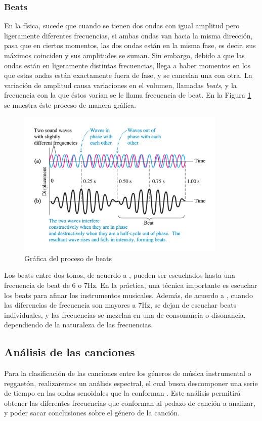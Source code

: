 \documentclass[12pt, letterpaper]{article}
\begin{document}
\subsubsection{Beats}
En la física, sucede que cuando se tienen dos ondas con igual amplitud pero ligeramente diferentes frecuencias, si ambas ondas van hacia la 
misma dirección, pasa que en ciertos momentos, las dos ondas están en la misma fase, es decir, sus máximos coinciden y sus amplitudes se suman. Sin embargo, 
debido a que las ondas están en ligeramente distintas frecuencias, llega a haber momentos en los que estas ondas están 
exactamente fuera de fase, y se cancelan una con otra. La variación de amplitud causa variaciones en el volumen, llamadas \textit{beats}, y la frecuencia 
con la que éstos varían se le llama frecuencia de beat. En la Figura \ref{beats-grafica} se muestra éste proceso de manera gráfica.
\begin{figure}[H]
  \centering
  \includegraphics[height = 7cm]{imgs/investigacion/beats-grafica.png}
  \caption{Gráfica del proceso de beats}
  \label{beats-grafica}
\end{figure}Los beats entre dos tonos, de acuerdo a \cite{university-physics}, pueden ser escuchados hasta una frecuencia de beat de 6 o 7Hz. En la práctica, 
una técnica importante es escuchar los beats para afinar los instrumentos musicales. Además, de acuerdo a \cite{university-physics}, cuando las diferencias de 
frecuencia son mayores a 7Hz, se dejan de escuchar beats individuales, y las frecuencias se mezclan en una de consonancia o disonancia, dependiendo de la 
naturaleza de las frecuencias. 
\subsection{Análisis de las canciones}

Para la clasificación de las canciones entre los géneros de música instrumental o reggaetón,
realizaremos un análisis espectral, el cual busca descomponer una serie de tiempo en las
ondas senoidales que la conforman \cite{Montenegro-2009}. Este análisis permitirá obtener las
diferentes frecuencias que conforman al pedazo de canción a analizar, y poder sacar conclusiones
sobre el género de la canción. \medskip
\end{document}
